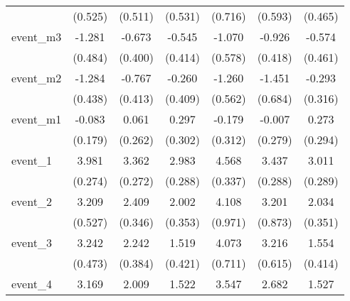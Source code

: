 {\begin{tabular}{l*{6}{c}}
            &     (0.525)         &     (0.511)         &     (0.531)         &     (0.716)         &     (0.593)         &     (0.465)         \\
[1em]
event\_m3    &      -1.281\sym{**} &      -0.673         &      -0.545         &      -1.070         &      -0.926\sym{*}  &      -0.574         \\
            &     (0.484)         &     (0.400)         &     (0.414)         &     (0.578)         &     (0.418)         &     (0.461)         \\
[1em]
event\_m2    &      -1.284\sym{**} &      -0.767         &      -0.260         &      -1.260\sym{*}  &      -1.451\sym{*}  &      -0.293         \\
            &     (0.438)         &     (0.413)         &     (0.409)         &     (0.562)         &     (0.684)         &     (0.316)         \\
[1em]
event\_m1    &      -0.083         &       0.061         &       0.297         &      -0.179         &      -0.007         &       0.273         \\
            &     (0.179)         &     (0.262)         &     (0.302)         &     (0.312)         &     (0.279)         &     (0.294)         \\
[1em]
event\_1     &       3.981\sym{***}&       3.362\sym{***}&       2.983\sym{***}&       4.568\sym{***}&       3.437\sym{***}&       3.011\sym{***}\\
            &     (0.274)         &     (0.272)         &     (0.288)         &     (0.337)         &     (0.288)         &     (0.289)         \\
[1em]
event\_2     &       3.209\sym{***}&       2.409\sym{***}&       2.002\sym{***}&       4.108\sym{***}&       3.201\sym{***}&       2.034\sym{***}\\
            &     (0.527)         &     (0.346)         &     (0.353)         &     (0.971)         &     (0.873)         &     (0.351)         \\
[1em]
event\_3     &       3.242\sym{***}&       2.242\sym{***}&       1.519\sym{***}&       4.073\sym{***}&       3.216\sym{***}&       1.554\sym{***}\\
            &     (0.473)         &     (0.384)         &     (0.421)         &     (0.711)         &     (0.615)         &     (0.414)         \\
[1em]
event\_4     &       3.169\sym{***}&       2.009\sym{***}&       1.522\sym{***}&       3.547\sym{***}&       2.682\sym{***}&       1.527\sym{**} \\

\end{tabular}}

